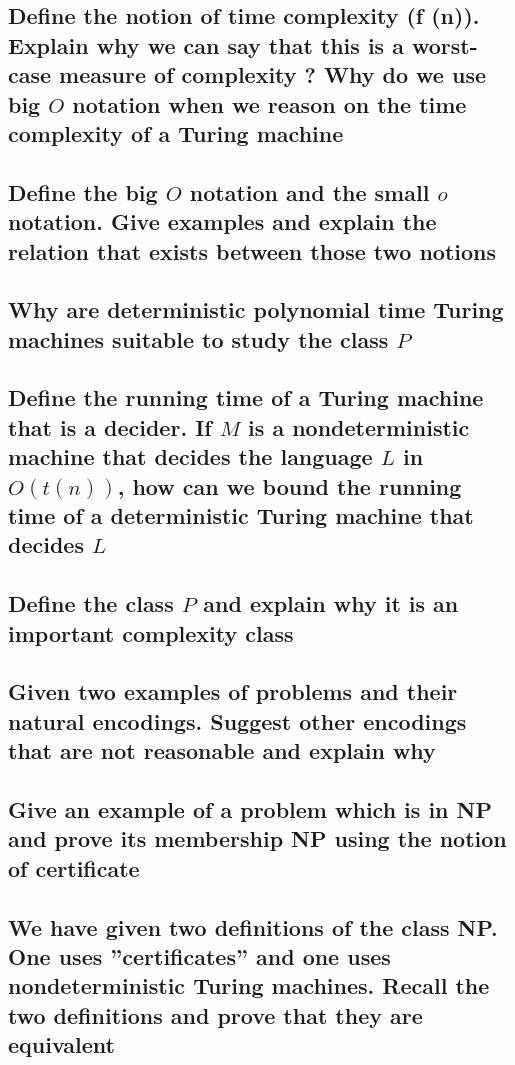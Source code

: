 \documentclass[main.tex]{subfiles}
\begin{document}
\subsection{Define the notion of time complexity (f (n)). Explain why we can say that this is a worst-case measure of complexity ? Why do we use big $O$ notation when we reason on the time complexity of a Turing machine}

\subsection{Define the big $O$ notation and the small $o$ notation. Give examples and explain the relation that exists between those two notions}

\subsection{Why are deterministic polynomial time Turing machines suitable to study the class $P$}

\subsection{Define the running time of a Turing machine that is a decider. If $M$ is a nondeterministic machine that decides the language $L$ in $O(t(n))$, how can we bound the running time of a deterministic Turing machine that decides $L$}

\subsection{Define the class $P$ and explain why it is an important complexity class}

\subsection{Given two examples of problems and their natural encodings. Suggest other encodings that are not reasonable and explain why}

\subsection{Give an example of a problem which is in NP and prove its membership NP using the notion of certificate}

\subsection{We have given two definitions of the class NP. One uses ”certificates” and one uses nondeterministic Turing machines. Recall the two definitions and prove that they are equivalent}
\end{document}
